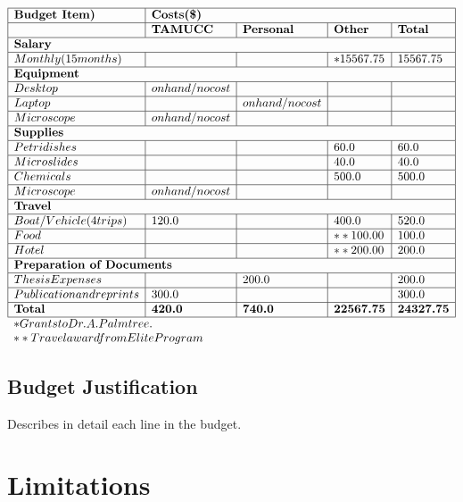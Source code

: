 \documentclass[12pt]{article}
\begin{document}
\[
\begin{array}{ | l | l | l | l | l | }
\hline
\textbf{Budget Item)} & \multicolumn{4}{l|}{\textbf{Costs(\$)}}  \\ \hline
 & \textbf{TAMUCC} & \textbf{Personal} & \textbf{Other} & \textbf{Total} \\ \hline
\multicolumn{5}{|l|}{\textbf{Salary}}   \\ \hline
      Monthly (15 months) &  &  & *15567.75 & 15567.75 \\ \hline
\multicolumn{5}{|l|}{\textbf{Equipment}}   \\ \hline
      Desktop  & on hand/no cost &  &  &  \\ \hline
      Laptop  &  & on hand/no cost &  &  \\ \hline
      Microscope & on hand/no cost &  &  &  \\ \hline
\multicolumn{5}{|l|}{\textbf{Supplies}}   \\ \hline
      Petri dishes &  &  & 60.0 & 60.0 \\ \hline
      Microslides &  &  & 40.0 & 40.0 \\ \hline
      Chemicals &  &  & 500.0 & 500.0 \\ \hline
      Microscope & on hand/no cost &  &  &  \\ \hline
\multicolumn{5}{|l|}{\textbf{Travel}}   \\ \hline
      Boat/Vehicle (4 trips) & 120.0 &  & 400.0 & 520.0 \\ \hline
      Food &  &  & **100.00 & 100.0 \\ \hline
      Hotel &  &  & **200.00 & 200.0 \\ \hline
\multicolumn{5}{|l|}{\textbf{Preparation of Documents}}   \\ \hline
      Thesis Expenses &  & 200.0 &  & 200.0 \\ \hline
      Publication and reprints & 300.0 &  &  & 300.0 \\ \hline
\textbf{Total} & \textbf{420.0} & \textbf{740.0} & \textbf{22567.75} & \textbf{24327.75} \\ \hline
\multicolumn{5}{l}{* Grants to Dr. A. Palmtree.}\\
\multicolumn{5}{l}{** Travel award from Elite Program}
\end{array}
\]

\subsection{Budget Justification}
Describes in detail each line in the budget. 

\newpage
\section{Limitations}
\lipsum[15-16] %

\newpage
\end{document}
